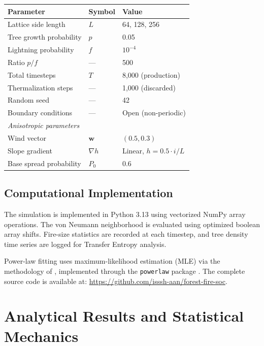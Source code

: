 \documentclass[12pt, a4paper]{article}
\begin{document}
\begin{center}
\begin{tabular}{lll}
    \toprule
    \textbf{Parameter} & \textbf{Symbol} & \textbf{Value} \\
    \midrule
    Lattice side length & $L$ & 64, 128, 256 \\
    Tree growth probability & $p$ & 0.05 \\
    Lightning probability & $f$ & $10^{-4}$ \\
    Ratio $p/f$ & --- & 500 \\
    Total timesteps & $T$ & 8,000 (production) \\
    Thermalization steps & --- & 1,000 (discarded) \\
    Random seed & --- & 42 \\
    Boundary conditions & --- & Open (non-periodic) \\
    \midrule
    \multicolumn{3}{l}{\textit{Anisotropic parameters}} \\
    Wind vector & $\mathbf{w}$ & $(0.5, 0.3)$ \\
    Slope gradient & $\nabla h$ & Linear, $h = 0.5 \cdot i / L$ \\
    Base spread probability & $P_0$ & 0.6 \\
    \bottomrule
\end{tabular}
\end{center}

\subsection{Computational Implementation}

The simulation is implemented in Python 3.13 using vectorized NumPy array operations. The von Neumann neighborhood is evaluated using optimized boolean array shifts. Fire-size statistics are recorded at each timestep, and tree density time series are logged for Transfer Entropy analysis.

Power-law fitting uses maximum-likelihood estimation (MLE) via the methodology of \citet{clauset2009}, implemented through the \texttt{powerlaw} package \citep{alstott2014}. The complete source code is available at: \url{https://github.com/isssh-aan/forest-fire-soc}.


\section{Analytical Results and Statistical Mechanics}
\label{sec:results}
\end{document}
